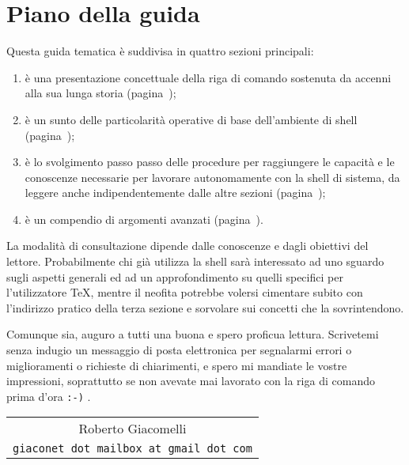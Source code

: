 
%
%
%
\chapter{Piano della guida}

Questa guida tematica è suddivisa in quattro sezioni principali:
\begin{enumerate}
\item è una presentazione concettuale della riga di comando sostenuta da accenni alla sua lunga storia (pagina~\pageref{chapConsole});

\item è un sunto delle particolarità operative di base dell'ambiente di shell (pagina~\pageref{chapShell});

\item è lo svolgimento passo passo delle procedure per raggiungere le capacità e le conoscenze necessarie per lavorare autonomamente con la shell di sistema, da leggere anche indipendentemente dalle altre sezioni (pagina~\pageref{chapEser});

\item è un compendio di argomenti avanzati (pagina~\pageref{chapAvanz}).
\end{enumerate}

La modalità di consultazione dipende dalle conoscenze e dagli obiettivi del lettore. Probabilmente chi già utilizza la shell sarà interessato ad uno sguardo sugli aspetti generali ed ad un approfondimento su quelli specifici per l'utilizzatore \TeX, mentre il neofita potrebbe volersi cimentare subito con l'indirizzo pratico della terza sezione e sorvolare sui concetti che la sovrintendono.

Comunque sia, auguro a tutti una buona e spero proficua lettura. Scrivetemi senza indugio un messaggio di posta elettronica per segnalarmi errori o miglioramenti o richieste di chiarimenti, e spero mi mandiate le vostre impressioni, soprattutto se non avevate mai lavorato con la riga di comando prima d'ora \texttt{:-)} .

\medskip
\hfill\begin{tabular}{c}
Roberto Giacomelli\\
\texttt{giaconet dot mailbox at gmail dot com}\\
\end{tabular}
